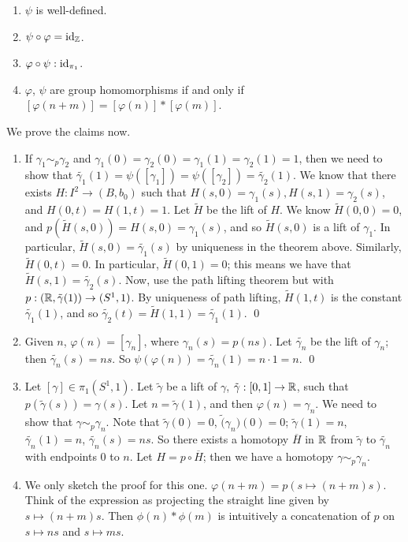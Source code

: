 \newpage
\begin{enumerate}[label=(\alph*)]
    \item $\psi$ is well-defined.
    \item $\psi \circ \varphi = \mathrm{id}_{\mathbb Z}$.
    \item $\varphi \circ \psi : \mathrm{id}_{\pi_1}$.
    \item $\varphi$, $\psi$ are group homomorphisms if and only if $[\varphi(n + m)] = [\varphi(n)] \ast [\varphi(m)]$.
\end{enumerate}
We prove the claims now.
\begin{enumerate}[label=(\alph*)]
    \item If $\gamma_1 \sim_p \gamma_2$ and $\gamma_1(0) = \gamma_2(0) = \gamma_1(1) = \gamma_2(1) = 1$, then we need to show that $\tilde{\gamma_1}(1) = \psi([\gamma_1]) = \psi([\gamma_2]) = \tilde{\gamma_2}(1)$. We know that there exists $H : I^2 \to (B, b_0)$ such that $H(s, 0) = \gamma_1(s), H(s, 1) = \gamma_2(s)$, and $H(0, t) = H(1, t) = 1$. Let $\tilde{H}$ be the lift of $H$.
    \medskip\newline
    We know $\tilde{H}(0, 0) = 0$, and $p(\tilde{H}(s, 0)) = H(s, 0) = \gamma_1(s)$, and so $\tilde{H}(s, 0)$ is a lift of $\gamma_1$. In particular, $\tilde{H}(s, 0) = \tilde{\gamma_1}(s)$ by uniqueness in the theorem above. Similarly, $\tilde{H}(0, t) = 0$. In particular, $\tilde{H}(0, 1) = 0$; this means we have that $\tilde{H}(s, 1) = \tilde{\gamma_2}(s)$. Now, use the path lifting theorem but with $p : (\mathbb R, \tilde{\gamma}(1)) \to (S^1, 1)$. By uniqueness of path lifting, $\tilde{H}(1, t)$ is the constant $\tilde{\gamma_1}(1)$, and so $\tilde{\gamma_2}(t) = \tilde{H}(1, 1) = \tilde{\gamma_1}(1)$. \qed

    \item Given $n$, $\varphi(n) = [\gamma_n]$, where $\gamma_n(s) = p(ns)$. Let $\tilde{\gamma_n}$ be the lift of $\gamma_n$; then $\tilde{\gamma_n}(s) = ns$. So $\psi(\varphi(n)) = \tilde{\gamma_n}(1) = n \cdot 1 = n$. \qed
    
    \item Let $[\gamma] \in \pi_1(S^1, 1)$. Let $\tilde{\gamma}$ be a lift of $\gamma$, $\tilde{\gamma} : [0, 1] \to \mathbb R$, such that $p(\tilde{\gamma}(s)) = \gamma(s)$. Let $n = \tilde{\gamma}(1)$, and then $\varphi(n) = \gamma_n$. We need to show that $\gamma \sim_p \gamma_n$. Note that $\tilde{\gamma}(0) = 0$, $\tilde(\gamma_n)(0) = 0$; $\tilde{\gamma}(1) = n$, $\tilde{\gamma_n}(1) = n$, $\tilde{\gamma_n}(s) = ns$. So there exists a homotopy $\overline{H}$ in $\mathbb R$ from $\tilde{\gamma}$ to $\tilde{\gamma_n}$ with endpoints $0$ to $n$. Let $H = p \circ \overline{H}$; then we have a homotopy $\gamma \sim_p \gamma_n$.
    
    \item We only sketch the proof for this one. $\varphi(n + m) = p(s \mapsto (n + m)s)$. Think of the expression as projecting the straight line given by $s \mapsto (n + m)s$. Then $\phi(n) \ast \phi(m)$ is intuitively a concatenation of $p$ on $s \mapsto ns$ and $s \mapsto ms$.
\end{enumerate}

